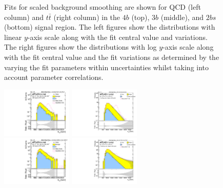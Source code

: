 \begin{figure}[htbp!]
\begin{center}
\caption{Fits for scaled background smoothing are shown for QCD (left column) and $t\bar{t}$ (right column) in the $4b$ (top), $3b$ (middle), and $2bs$ (bottom) signal region.  The left figures show the distributions with linear $y$-axis scale along with the fit central value and variations. The right figures show the  distributions with log $y$-axis scale along with the fit central value and the fit variations as determined by the varying the fit parameters within uncertainties whilst taking into account parameter correlations. }
\label{fig:signal-region-mjjscaled-smoothing}
\end{center}
\end{figure}


\begin{figure}[htbp!]
\begin{center}
\includegraphics[width=0.3\textwidth,angle=-90]{figures/boosted/Signal/b77_FourTag_Signal_mHH_pole_1_blind.pdf}
\includegraphics[width=0.3\textwidth,angle=-90]{figures/boosted/Smooth/Moriond_bkg_9_FourTag_pole_Signal_mHH_pole_1_blind.pdf}\\
\includegraphics[width=0.3\textwidth,angle=-90]{figures/boosted/Signal/b77_ThreeTag_Signal_mHH_pole_1_blind.pdf}
\includegraphics[width=0.3\textwidth,angle=-90]{figures/boosted/Smooth/Moriond_bkg_9_ThreeTag_pole_Signal_mHH_pole_1_blind.pdf}\\

\end{center}
\end{figure}
